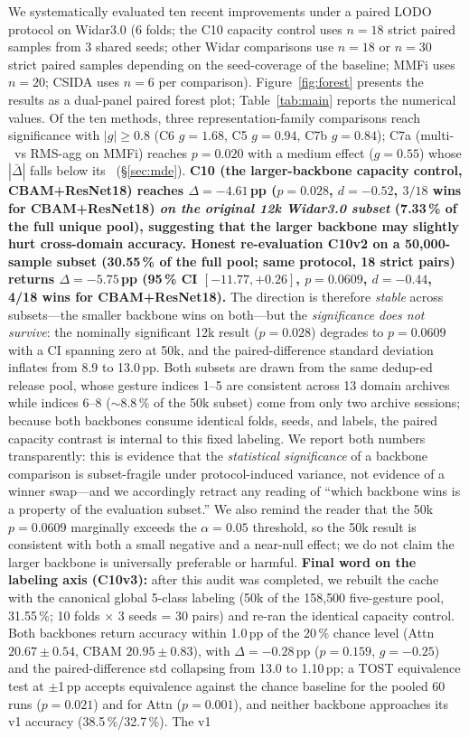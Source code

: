 \documentclass[journal,11pt]{IEEEtran}
\newcommand{\MDE}{\text{MDE}}
\newcommand{\Rx}{\text{Rx}}
\begin{document}
We systematically evaluated ten recent improvements under a paired LODO protocol on Widar3.0 (6 folds; the C10 capacity control uses $n = 18$ strict paired samples from 3 shared seeds; other Widar comparisons use $n = 18$ or $n = 30$ strict paired samples depending on the seed-coverage of the baseline; MMFi uses $n = 20$; CSIDA uses $n = 6$ per comparison). Figure~\ref{fig:forest} presents the results as a dual-panel paired forest plot; Table~\ref{tab:main} reports the numerical values. Of the ten methods, three representation-family comparisons reach significance with $|g| \geq 0.8$ (C6 $g = 1.68$, C5 $g = 0.94$, C7b $g = 0.84$); C7a (multi-\Rx\ vs RMS-agg on MMFi) reaches $p = 0.020$ with a medium effect ($g = 0.55$) whose $|\bar{\Delta}|$ falls below its \MDE\ (\S\ref{sec:mde}). \textbf{C10 (the larger-backbone capacity control, CBAM+ResNet18) reaches $\Delta = -4.61$\,pp ($p = 0.028$, $d = -0.52$, $3/18$ wins for CBAM+ResNet18) \emph{on the original 12k Widar3.0 subset} (7.33\,\% of the full unique pool), suggesting that the larger backbone may slightly hurt cross-domain accuracy. Honest re-evaluation \textbf{C10v2} on a 50{,}000-sample subset (30.55\,\% of the full pool; same protocol, 18 strict pairs) returns $\Delta = -5.75$\,pp (95\,\% CI $[-11.77, +0.26]$, $p = 0.0609$, $d = -0.44$, 4/18 wins for CBAM+ResNet18).} The direction is therefore \emph{stable} across subsets---the smaller backbone wins on both---but the \emph{significance does not survive}: the nominally significant 12k result ($p = 0.028$) degrades to $p = 0.0609$ with a CI spanning zero at 50k, and the paired-difference standard deviation inflates from 8.9 to 13.0\,pp. Both subsets are drawn from the same dedup-ed release pool, whose gesture indices 1--5 are consistent across 13 domain archives while indices 6--8 (${\sim}8.8\,\%$ of the 50k subset) come from only two archive sessions; because both backbones consume identical folds, seeds, and labels, the paired capacity contrast is internal to this fixed labeling. We report both numbers transparently: this is evidence that the \emph{statistical significance} of a backbone comparison is subset-fragile under protocol-induced variance, not evidence of a winner swap---and we accordingly retract any reading of ``which backbone wins is a property of the evaluation subset.'' We also remind the reader that the 50k $p = 0.0609$ marginally exceeds the $\alpha = 0.05$ threshold, so the 50k result is consistent with both a small negative and a near-null effect; we do not claim the larger backbone is universally preferable or harmful. \textbf{Final word on the labeling axis (C10v3):} after this audit was completed, we rebuilt the cache with the canonical global 5-class labeling (50k of the 158{,}500 five-gesture pool, 31.55\,\%; 10 folds $\times$ 3 seeds = 30 pairs) and re-ran the identical capacity control. Both backbones return accuracy within 1.0\,pp of the 20\,\% chance level (Attn $20.67 \pm 0.54$, CBAM $20.95 \pm 0.83$), with $\Delta = -0.28$\,pp ($p = 0.159$, $g = -0.25$) and the paired-difference std collapsing from 13.0 to 1.10\,pp; a TOST equivalence test at $\pm$1\,pp accepts equivalence against the chance baseline for the pooled 60 runs ($p = 0.021$) and for Attn ($p = 0.001$), and neither backbone approaches its v1 accuracy (38.5\,\%/32.7\,\%). The v1 
\end{document}
